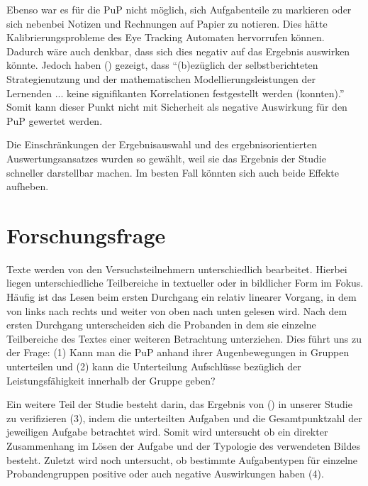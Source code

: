 Ebenso war es für die \gls{PuP} nicht möglich, sich Aufgabenteile zu markieren oder sich nebenbei Notizen und Rechnungen auf Papier zu notieren. Dies hätte Kalibrierungsprobleme des Eye Tracking Automaten hervorrufen können. Dadurch wäre auch denkbar, dass sich dies negativ auf das Ergebnis auswirken könnte. Jedoch haben \citeauthor{schukajlow2011selbstberichtete} () gezeigt, dass ``(b)ezüglich der selbstberichteten Strategienutzung und der mathematischen Modellierungsleistungen der Lernenden ... keine signifikanten Korrelationen festgestellt werden (konnten).'' Somit kann dieser Punkt nicht mit Sicherheit als negative Auswirkung für den \gls{PuP} gewertet werden. 

Die Einschränkungen der Ergebnisauswahl und des ergebnisorientierten Auswertungsansatzes wurden so gewählt, weil sie das Ergebnis der Studie schneller darstellbar machen. Im besten Fall könnten sich auch beide Effekte aufheben.
\section{Forschungsfrage}

Texte werden von den Versuchsteilnehmern unterschiedlich bearbeitet. Hierbei liegen unterschiedliche Teilbereiche in textueller oder in bildlicher Form im Fokus. Häufig ist das Lesen beim ersten Durchgang ein relativ linearer Vorgang, in dem von links nach rechts und weiter von oben nach unten gelesen wird. Nach dem ersten Durchgang unterscheiden sich die Probanden in dem sie einzelne Teilbereiche des Textes einer weiteren Betrachtung unterziehen. Dies führt uns zu der Frage:
(1) Kann man die \gls{PuP} anhand ihrer Augenbewegungen in Gruppen unterteilen und (2) kann die Unterteilung Aufschlüsse bezüglich der Leistungsfähigkeit innerhalb der Gruppe geben?

Ein weitere Teil der Studie besteht darin, das Ergebnis von \citeauthor{bockmannvalue} () in unserer Studie zu verifizieren (3), indem die unterteilten Aufgaben und die Gesamtpunktzahl der jeweiligen Aufgabe betrachtet wird. Somit wird untersucht ob ein direkter Zusammenhang im Lösen der Aufgabe und der Typologie des verwendeten Bildes besteht. Zuletzt wird noch untersucht, ob bestimmte Aufgabentypen für einzelne Probandengruppen positive oder auch negative Auswirkungen haben (4).